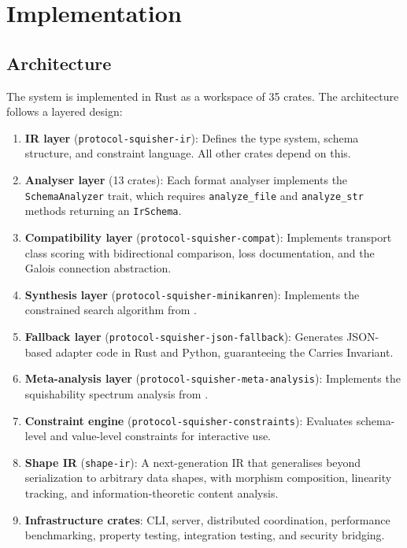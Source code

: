 \documentclass[11pt,a4paper]{article}
\theoremstyle{definition}
\theoremstyle{remark}
\begin{document}
\section{Implementation}\label{sec:implementation}

\subsection{Architecture}

The system is implemented in Rust as a workspace of 35 crates. The
architecture follows a layered design:

\begin{enumerate}
  \item \textbf{IR layer} (\texttt{protocol-squisher-ir}): Defines the
    type system, schema structure, and constraint language. All
    other crates depend on this.

  \item \textbf{Analyser layer} (13 crates): Each format analyser
    implements the \texttt{SchemaAnalyzer} trait, which requires
    \texttt{analyze\_file} and \texttt{analyze\_str} methods returning
    an \texttt{IrSchema}.

  \item \textbf{Compatibility layer} (\texttt{protocol-squisher-compat}):
    Implements transport class scoring with bidirectional comparison,
    loss documentation, and the Galois connection abstraction.

  \item \textbf{Synthesis layer}
    (\texttt{protocol-squisher-minikanren}): Implements the
    constrained search algorithm from .

  \item \textbf{Fallback layer}
    (\texttt{protocol-squisher-json-fallback}): Generates JSON-based
    adapter code in Rust and Python, guaranteeing the Carries
    Invariant.

  \item \textbf{Meta-analysis layer}
    (\texttt{protocol-squisher-meta-analysis}): Implements the
    squishability spectrum analysis from .

  \item \textbf{Constraint engine}
    (\texttt{protocol-squisher-constraints}): Evaluates schema-level
    and value-level constraints for interactive use.

  \item \textbf{Shape IR} (\texttt{shape-ir}): A next-generation IR
    that generalises beyond serialization to arbitrary data shapes,
    with morphism composition, linearity tracking, and
    information-theoretic content analysis.

  \item \textbf{Infrastructure crates}: CLI, server, distributed
    coordination, performance benchmarking, property testing,
    integration testing, and security bridging.
\end{enumerate}
\end{document}
